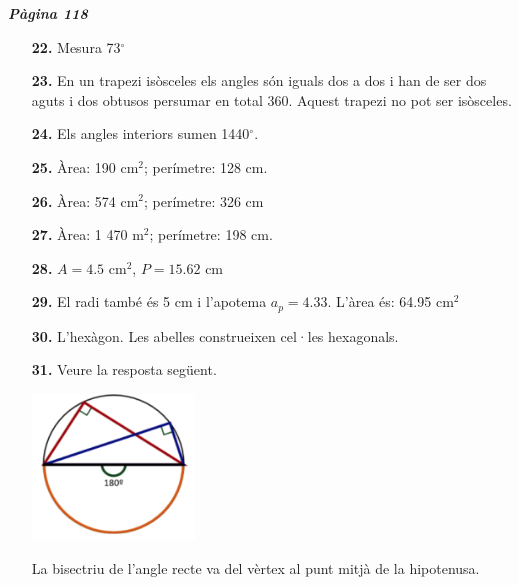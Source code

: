 \documentclass[a4paper, pdf, twoside]{book}
\begin{document}
\begin{multicols}{2}
{\textbf{\em Pàgina 118}} \hrulefill
\begin{enumerate}
\vspace{0.25cm}
\item[\fontfamily{phv}\selectfont\color{blue}\textbf{22. }] 
Mesura 73${}^\circ $
 \end{enumerate}
\begin{enumerate}
\vspace{0.25cm}
\item[\fontfamily{phv}\selectfont\color{blue}\textbf{23. }] 
En un trapezi isòsceles els angles són iguals dos a dos i han de ser dos aguts i dos obtusos persumar en total 360. Aquest trapezi no pot ser isòsceles.
\vspace{0.25cm}
\item[\fontfamily{phv}\selectfont\color{blue}\textbf{24. }] 
Els angles interiors sumen 1440${}^\circ $.
\vspace{0.25cm}
\item[\fontfamily{phv}\selectfont\color{blue}\textbf{25. }] 
Àrea: 190 cm$^2$; perímetre: 128 cm.
\vspace{0.25cm}
\item[\fontfamily{phv}\selectfont\color{blue}\textbf{26. }] 
Àrea: 574 cm$^2$; perímetre: 326 cm
\vspace{0.25cm}
\item[\fontfamily{phv}\selectfont\color{blue}\textbf{27. }] 
Àrea: 1 470 m$^2$; perímetre: 198 cm.
\vspace{0.25cm}
\item[\fontfamily{phv}\selectfont\color{blue}\textbf{28. }]  \scalebox{0.6}{\simbolclau } 
$A=4.5$ cm$^2$, $P=15.62$ cm
\vspace{0.25cm}
\item[\fontfamily{phv}\selectfont\color{blue}\textbf{29. }] 
El radi també és 5 cm i l'apotema $a_p=4.33$. L'àrea és: 64.95 cm$^2$
\vspace{0.25cm}
\item[\fontfamily{phv}\selectfont\color{blue}\textbf{30. }] 
L'hexàgon. Les abelles construeixen cel·les hexagonals.
\vspace{0.25cm}
\item[\fontfamily{phv}\selectfont\color{blue}\textbf{31. }] 
 Veure la resposta següent.\par \includegraphics [width=0.34\textwidth ]{img-sol/t9-32} \par La bisectriu de l'angle recte va del vèrtex al punt mitjà de la hipotenusa.

\end{enumerate}
\end{multicols}
\end{document}
